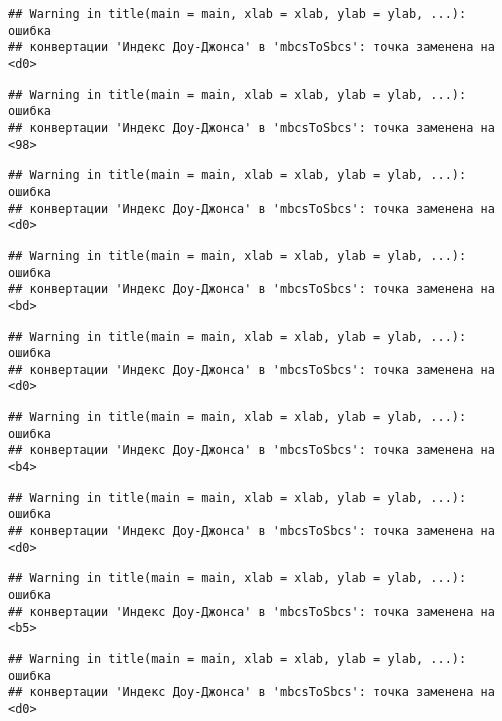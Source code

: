 \documentclass[
]{article}
\begin{document}
\begin{verbatim}
## Warning in title(main = main, xlab = xlab, ylab = ylab, ...): ошибка
## конвертации 'Индекс Доу-Джонса' в 'mbcsToSbcs': точка заменена на <d0>
\end{verbatim}

\begin{verbatim}
## Warning in title(main = main, xlab = xlab, ylab = ylab, ...): ошибка
## конвертации 'Индекс Доу-Джонса' в 'mbcsToSbcs': точка заменена на <98>
\end{verbatim}

\begin{verbatim}
## Warning in title(main = main, xlab = xlab, ylab = ylab, ...): ошибка
## конвертации 'Индекс Доу-Джонса' в 'mbcsToSbcs': точка заменена на <d0>
\end{verbatim}

\begin{verbatim}
## Warning in title(main = main, xlab = xlab, ylab = ylab, ...): ошибка
## конвертации 'Индекс Доу-Джонса' в 'mbcsToSbcs': точка заменена на <bd>
\end{verbatim}

\begin{verbatim}
## Warning in title(main = main, xlab = xlab, ylab = ylab, ...): ошибка
## конвертации 'Индекс Доу-Джонса' в 'mbcsToSbcs': точка заменена на <d0>
\end{verbatim}

\begin{verbatim}
## Warning in title(main = main, xlab = xlab, ylab = ylab, ...): ошибка
## конвертации 'Индекс Доу-Джонса' в 'mbcsToSbcs': точка заменена на <b4>
\end{verbatim}

\begin{verbatim}
## Warning in title(main = main, xlab = xlab, ylab = ylab, ...): ошибка
## конвертации 'Индекс Доу-Джонса' в 'mbcsToSbcs': точка заменена на <d0>
\end{verbatim}

\begin{verbatim}
## Warning in title(main = main, xlab = xlab, ylab = ylab, ...): ошибка
## конвертации 'Индекс Доу-Джонса' в 'mbcsToSbcs': точка заменена на <b5>
\end{verbatim}

\begin{verbatim}
## Warning in title(main = main, xlab = xlab, ylab = ylab, ...): ошибка
## конвертации 'Индекс Доу-Джонса' в 'mbcsToSbcs': точка заменена на <d0>
\end{verbatim}
\end{document}
